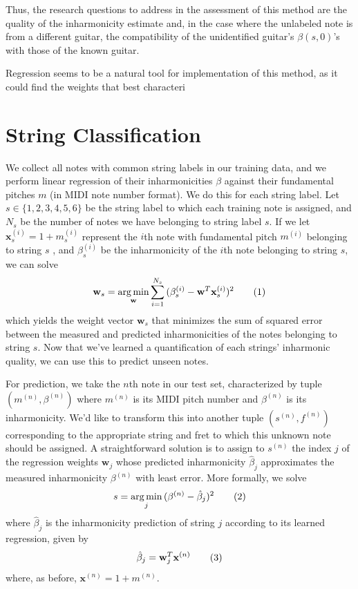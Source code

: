 \documentclass[12pt]{cmuthesis}
\DeclareMathOperator*{\argmin}{arg\,min}
\newcommand\addtag{\refstepcounter{equation}\tag{\theequation}}
\begin{document}
Thus, the research questions to address in the assessment of this method are the quality of the inharmonicity estimate and, in the case where the unlabeled note is from a different guitar, the compatibility of the unidentified guitar's $\beta(s,0)$'s with those of the known guitar.

Regression seems to be a natural tool for implementation of this method, as it could find the weights that best characteri

\section{String Classification}
We collect all notes with common string labels in our training data, and we perform linear regression of their inharmonicities $\beta$ against their fundamental pitches $m$ (in MIDI note number format). We do this for each string label. Let $s \in \{1,2,3,4,5,6\}$ be the string label to which each training note is assigned, and $N_s$ be the number of notes we have belonging to string label $s$. If we let $\mathbf{x}_s^{(i)} = 1 + m_s^{(i)}$ represent the $i$th note with fundamental pitch $m^{(i)}$ belonging to string $s$ , and $\beta_s^{(i)}$ be the inharmonicity of the $i$th note belonging to string $s$, we can solve
\[
\mathbf{w}_s = \argmin_{\mathbf{w}}{\sum_{i=1}^{N_s}{(\beta^{(i)}_s - \mathbf{w}^T\mathbf{x}^{(i)}_s)^2}}\addtag
\]
which yields the weight vector $\mathbf{w}_s$ that minimizes the sum of squared error between the measured and predicted inharmonicities of the notes belonging to string $s$. Now that we've learned a quantification of each strings' inharmonic quality, we can use this to predict unseen notes.

For prediction, we take the $n$th note in our test set, characterized by tuple $(m^{(n)},\beta^{(n)})$ where $m^{(n)}$ is its MIDI pitch number and $\beta^{(n)}$ is its inharmonicity. We'd like to transform this into another tuple $(s^{(n)},f^{(n)})$ corresponding to the appropriate string and fret to which this unknown note should be assigned. A straightforward solution is to assign to $s^{(n)}$ the index $j$ of the regression weights $\mathbf{w}_j$ whose predicted inharmonicity $\hat\beta_j$ approximates the measured inharmonicity $\beta^{(n)}$ with least error. More formally, we solve 
\[
s = \argmin_{j}{(\beta^{(n)} - \hat{\beta}_{j})^2} \addtag
\]
where $\hat\beta_j$ is the inharmonicity prediction of string $j$ according to its learned regression, given by
\[
\hat{\beta}_{j} = \mathbf{w}_{j}^T\mathbf{x}^{(n)} \addtag
\]
where, as before, $\mathbf{x}^{(n)} = 1 + m^{(n)}$. 
\end{document}
